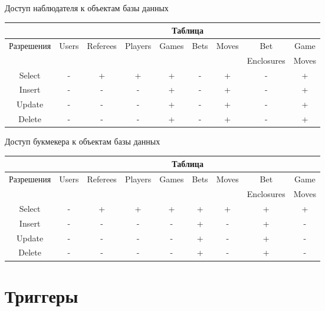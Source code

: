 \begin{center}
	\begin{threeparttable}
		\captionsetup{justification=raggedright,singlelinecheck=off}
		\caption{\label{spectator_privileges}Доступ наблюдателя к объектам базы данных}
		\centering
		\begin{tabular}{|c|c|c|c|c|c|c|c|c|}
			\hline
			& \multicolumn{8}{|c|}{Таблица} \\
			\hline
			Разрешения & Users & Referees & Players & Games & Bets & Moves & Bet & Game \\
			&&&&&&& Enclosures & Moves \\
			\hline
			Select & - & + & + & + & - & + & - & + \\
			\hline
			Insert & - & - & - & + & - & + & - & + \\
			\hline
			Update & - & - & - & + & - & + & - & + \\
			\hline
			Delete & - & - & - & + & - & + & - & + \\
			\hline
		\end{tabular}
	\end{threeparttable}
\end{center}
\begin{center}
	\begin{threeparttable}
		\captionsetup{justification=raggedright,singlelinecheck=off}
		\caption{\label{bookmaker_privileges}Доступ букмекера к объектам базы данных}
		\centering
		\begin{tabular}{|c|c|c|c|c|c|c|c|c|}
			\hline
			& \multicolumn{8}{|c|}{Таблица} \\
			\hline
			Разрешения & Users & Referees & Players & Games & Bets & Moves & Bet & Game \\
			&&&&&&& Enclosures & Moves \\
			\hline
			Select & - & + & + & + & + & + & + & + \\
			\hline
			Insert & - & - & - & - & + & - & + & - \\
			\hline
			Update & - & - & - & - & + & - & + & - \\
			\hline
			Delete & - & - & - & - & + & - & + & - \\
			\hline
		\end{tabular}
	\end{threeparttable}
\end{center}

\section{Триггеры}

